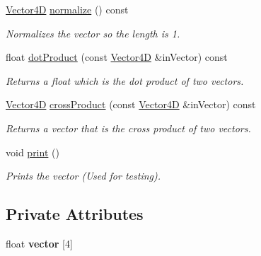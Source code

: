 \begin{DoxyCompactItemize}
\mbox{\label{class_vector4_d_a282d4e445811507686efec7dd7e22e49}} 
\mbox{\hyperlink{class_vector4_d}{Vector4D}} \mbox{\hyperlink{class_vector4_d_a282d4e445811507686efec7dd7e22e49}{normalize}} () const
\begin{DoxyCompactList}\small\item\em Normalizes the vector so the length is 1. \end{DoxyCompactList}\item 
\mbox{\label{class_vector4_d_a838c2e91707eebd70cbae77ef3d98cd7}} 
float \mbox{\hyperlink{class_vector4_d_a838c2e91707eebd70cbae77ef3d98cd7}{dot\+Product}} (const \mbox{\hyperlink{class_vector4_d}{Vector4D}} \&in\+Vector) const
\begin{DoxyCompactList}\small\item\em Returns a float which is the dot product of two vectors. \end{DoxyCompactList}\item 
\mbox{\label{class_vector4_d_a68c29bd9f69553967734464c142afe72}} 
\mbox{\hyperlink{class_vector4_d}{Vector4D}} \mbox{\hyperlink{class_vector4_d_a68c29bd9f69553967734464c142afe72}{cross\+Product}} (const \mbox{\hyperlink{class_vector4_d}{Vector4D}} \&in\+Vector) const
\begin{DoxyCompactList}\small\item\em Returns a vector that is the cross product of two vectors. \end{DoxyCompactList}\item 
\mbox{\label{class_vector4_d_a9389d589a619d183123ef654ceac779e}} 
void \mbox{\hyperlink{class_vector4_d_a9389d589a619d183123ef654ceac779e}{print}} ()
\begin{DoxyCompactList}\small\item\em Prints the vector (Used for testing). \end{DoxyCompactList}\end{DoxyCompactItemize}
\subsection*{Private Attributes}
\begin{DoxyCompactItemize}
\item 
\mbox{\label{class_vector4_d_af915ffef477aabadd220512e95cf2013}} 
float {\bfseries vector} \mbox{[}4\mbox{]}
\end{DoxyCompactItemize}
